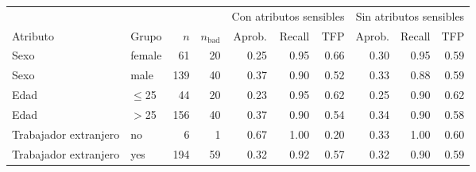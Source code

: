 \begin{tabular}{llrrrrrrrr}
\toprule
& & & & \multicolumn{3}{c}{Con atributos sensibles} & \multicolumn{3}{c}{Sin atributos sensibles} \\
\cmidrule(lr){5-7} \cmidrule(lr){8-10}
Atributo & Grupo & $n$ & $n_{\text{bad}}$ & Aprob. & Recall & TFP & Aprob. & Recall & TFP \\
\midrule
Sexo & female & \num{61} & \num{20} & \num{0.25} & \num{0.95} & \num{0.66} & \num{0.30} & \num{0.95} & \num{0.59} \\
Sexo & male & \num{139} & \num{40} & \num{0.37} & \num{0.90} & \num{0.52} & \num{0.33} & \num{0.88} & \num{0.59} \\
\midrule
Edad & $\leq$25 & \num{44} & \num{20} & \num{0.23} & \num{0.95} & \num{0.62} & \num{0.25} & \num{0.90} & \num{0.62} \\
Edad & $>$25 & \num{156} & \num{40} & \num{0.37} & \num{0.90} & \num{0.54} & \num{0.34} & \num{0.90} & \num{0.58} \\
\midrule
Trabajador extranjero & no & \num{6} & \num{1} & \num{0.67} & \num{1.00} & \num{0.20} & \num{0.33} & \num{1.00} & \num{0.60} \\
Trabajador extranjero & yes & \num{194} & \num{59} & \num{0.32} & \num{0.92} & \num{0.57} & \num{0.32} & \num{0.90} & \num{0.59} \\
\bottomrule
\end{tabular}
